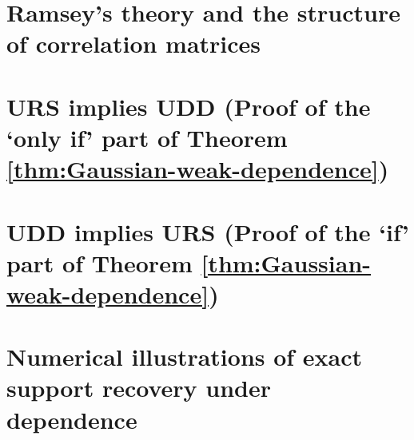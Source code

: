 \section{Ramsey's  theory and the structure of correlation matrices} 
\label{sec:Ramsey}


\section{URS implies UDD (Proof of the `only if' part of Theorem \ref{thm:Gaussian-weak-dependence})} 
\label{sec:URS=>UDD}


\section{UDD implies URS (Proof of the `if' part of Theorem \ref{thm:Gaussian-weak-dependence})} 
\label{sec:UDD=>URS}


\section{Numerical illustrations of exact support recovery under dependence}
\label{sec:URS-numerical}

